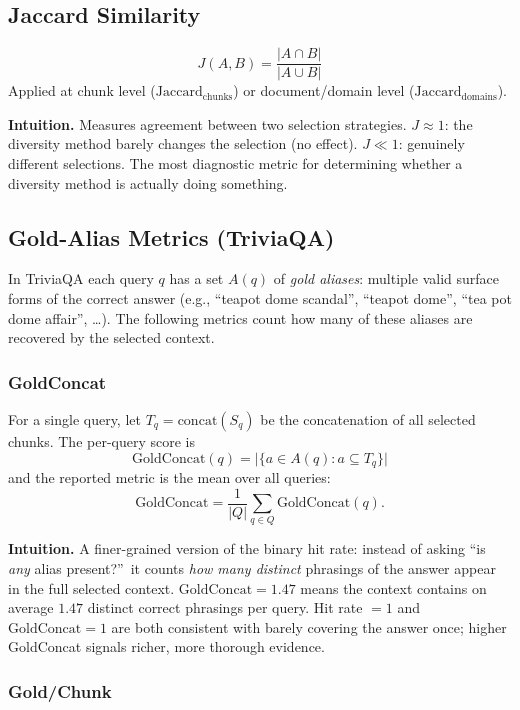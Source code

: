 \documentclass[11pt,a4paper]{article}
\begin{document}
\subsection{Jaccard Similarity}

\[
	J(A, B) = \frac{|A \cap B|}{|A \cup B|}
\]
Applied at chunk level ($\mathrm{Jaccard}_{\text{chunks}}$) or document/domain level ($\mathrm{Jaccard}_{\text{domains}}$).

\textbf{Intuition.} Measures agreement between two selection strategies. $J \approx 1$: the diversity method barely changes the selection (no effect). $J \ll 1$: genuinely different selections. The most diagnostic metric for determining whether a diversity method is actually doing something.

\subsection{Gold-Alias Metrics (TriviaQA)}

In TriviaQA each query $q$ has a set $A(q)$ of \emph{gold aliases}: multiple valid surface forms of the correct answer (e.g., ``teapot dome scandal'', ``teapot dome'', ``tea pot dome affair'', \ldots). The following metrics count how many of these aliases are recovered by the selected context.

\subsubsection{GoldConcat}

For a single query, let $T_q = \mathrm{concat}(S_q)$ be the concatenation of all selected chunks. The per-query score is
\[
	\mathrm{GoldConcat}(q) = \big|\{ a \in A(q) : a \subseteq T_q \}\big|
\]
and the reported metric is the mean over all queries:
\[
	\mathrm{GoldConcat} = \frac{1}{|Q|} \sum_{q \in Q} \mathrm{GoldConcat}(q).
\]

\textbf{Intuition.} A finer-grained version of the binary hit rate: instead of asking ``is \emph{any} alias present?''\ it counts \emph{how many distinct} phrasings of the answer appear in the full selected context. $\mathrm{GoldConcat} = 1.47$ means the context contains on average $1.47$ distinct correct phrasings per query. Hit rate $= 1$ and $\mathrm{GoldConcat} = 1$ are both consistent with barely covering the answer once; higher GoldConcat signals richer, more thorough evidence.

\subsubsection{Gold/Chunk}
\end{document}
